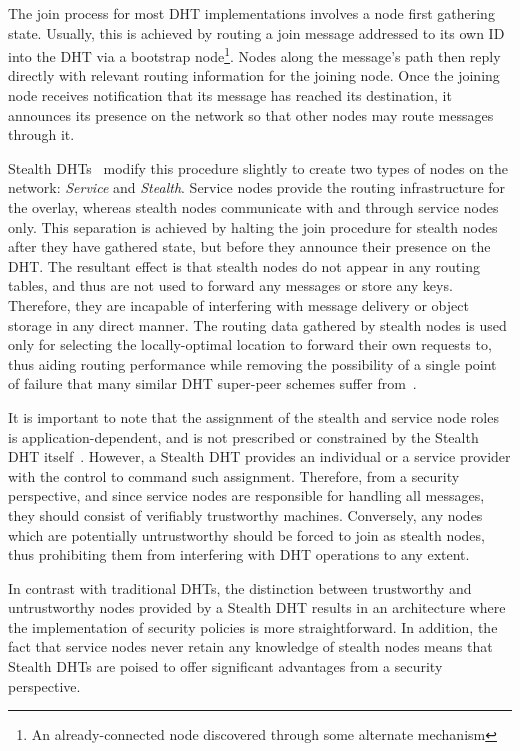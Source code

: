 \documentclass[times, 10pt,twocolumn]{article}
\begin{document}
\label{sect-dhtoverview}

The join process for most DHT implementations involves a node first
gathering state. Usually, this is achieved by routing a join message
addressed to its own ID into the DHT via a bootstrap node\footnote{An
already-connected node discovered through some alternate mechanism}.
Nodes along the message's path then reply directly with relevant
routing information for the joining node. Once the joining node
receives notification that its message has reached its destination, it
announces its presence on the network so that other nodes may route
messages through it.

Stealth DHTs~\cite{Brampton05Stealth} modify this procedure slightly to
create two types of nodes on the network: \emph{Service} and
\emph{Stealth}. Service nodes provide the routing infrastructure for
the overlay, whereas stealth nodes communicate with and through service
nodes only. This separation is achieved by halting the join procedure
for stealth nodes after they have gathered state, but before they
announce their presence on the DHT. The resultant effect is that
stealth nodes do not appear in any routing tables, and thus are not
used to forward any messages or store any keys. Therefore, they are
incapable of interfering with message delivery or object storage in any
direct manner. The routing data gathered by stealth nodes is used only
for selecting the locally-optimal location to forward their own
requests to, thus aiding routing performance while removing the
possibility of a single point of failure that many similar DHT
super-peer schemes suffer from~\cite{Mizrak03Structured}.

It is important to note that the assignment of the stealth and service
node roles is application-dependent, and is not prescribed or
constrained by the Stealth DHT itself~\cite{Brampton05Stealth}.
However, a Stealth DHT provides an individual or a service provider
with the control to command such assignment. Therefore, from a security
perspective, and since service nodes are responsible for handling all
messages, they should consist of verifiably trustworthy machines.
Conversely, any nodes which are potentially untrustworthy should be
forced to join as stealth nodes, thus prohibiting them from interfering
with DHT operations to any extent.

In contrast with traditional DHTs, the distinction between trustworthy
and untrustworthy nodes provided by a Stealth DHT results in an
architecture where the implementation of security policies is more
straightforward. In addition, the fact that service nodes never retain
any knowledge of stealth nodes means that Stealth DHTs are poised to
offer significant advantages from a security perspective.
\end{document}
